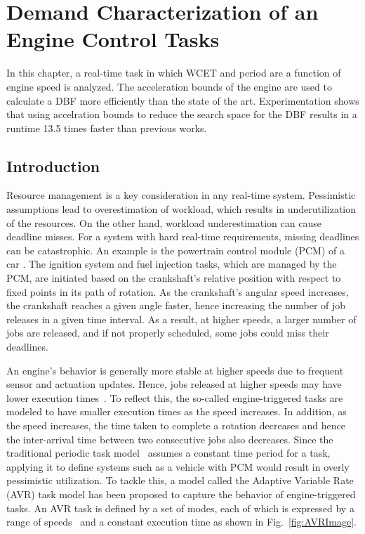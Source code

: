 \section{Demand Characterization of an Engine Control Tasks}   \label{chap:engCtrl}

In this chapter, a real-time task  in which WCET and period are a function of engine speed is analyzed.
The acceleration bounds of the engine are used to calculate a DBF more efficiently than the state of the art.
Experimentation shows that using accelration bounds to reduce the search space for the DBF results in a runtime 13.5 times faster than previous works.

\subsection{Introduction}

Resource management is a key consideration in any real-time system.
Pessimistic assumptions lead to overestimation of workload, which results in underutilization of the resources. On the other hand, workload underestimation can cause deadline misses.
For a system with hard real-time requirements, missing deadlines can be catastrophic.
An example is the powertrain control module (PCM) of a car \cite{noauthor_electricalelectronic_2008}. 
The ignition system and fuel injection tasks, which are managed by the PCM, are initiated based on the crankshaft's relative position with respect to fixed points in its path of rotation. 
As the crankshaft's angular speed increases, the crankshaft reaches a given angle faster, hence increasing the number of job releases in a given time interval.
As a result, at higher speeds, a larger number of jobs are released, and if not properly scheduled, some jobs could miss their deadlines.

An engine's behavior is generally more stable at higher speeds due to frequent sensor and actuation updates. Hence, jobs released at higher speeds may have lower execution times~\cite{dbuttle_real-time_nodate}.
To reflect this, the so-called engine-triggered tasks are modeled to have smaller execution times as the speed increases.
In addition, as the speed increases, the time taken to complete a rotation decreases and hence the inter-arrival time between two consecutive jobs also decreases.
Since the traditional periodic task model~\cite{liu_scheduling_1973} assumes a constant time period for a task, applying it to define systems such as a vehicle with PCM would result in overly pessimistic utilization.
To tackle this, a model called the Adaptive Variable Rate (AVR) task model has been proposed to capture the behavior of engine-triggered tasks.
An AVR task is defined by a set of modes, each of which is expressed by a range of speeds~\cite{dbuttle_real-time_nodate} and a constant execution time as shown in Fig.~\ref{fig:AVRImage}.

